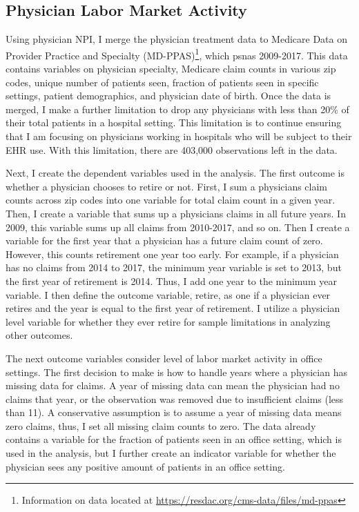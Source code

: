 \documentclass[12pt]{article}
\begin{document}
\subsection{Physician Labor Market Activity}\label{sec:appmdppas}

Using physician NPI, I merge the physician treatment data to Medicare Data on Provider Practice and Specialty (MD-PPAS)\footnote{Information on data located at \hyperlink{https://resdac.org/cms-data/files/md-ppas}{https://resdac.org/cms-data/files/md-ppas}}, which psnas 2009-2017. This data contains variables on physician specialty, Medicare claim counts in various zip codes, unique number of patients seen, fraction of patients seen in specific settings, patient demographics, and physician date of birth. Once the data is merged, I make a further limitation to drop any physicians with less than 20\% of their total patients in a hospital setting. This limitation is to continue ensuring that I am focusing on physicians working in hospitals who will be subject to their EHR use. With this limitation, there are 403,000 observations left in the data. 

Next, I create the dependent variables used in the analysis. The first outcome is whether a physician chooses to retire or not. First, I sum a physicians claim counts across zip codes into one variable for total claim count in a given year. Then, I create a variable that sums up a physicians claims in all future years. In 2009, this variable sums up all claims from 2010-2017, and so on. Then I create a variable for the first year that a physician has a future claim count of zero. However, this counts retirement one year too early. For example, if a physician has no claims from 2014 to 2017, the minimum year variable is set to 2013, but the first year of retirement is 2014. Thus, I add one year to the minimum year variable. I then define the outcome variable, retire, as one if a physician ever retires and the year is equal to the first year of retirement. I utilize a physician level variable for whether they ever retire for sample limitations in analyzing other outcomes. 

The next outcome variables consider level of labor market activity in office settings. The first decision to make is how to handle years where a physician has missing data for claims. A year of missing data can mean the physician had no claims that year, or the observation was removed due to insufficient claims (less than 11). A conservative assumption is to assume a year of missing data means zero claims, thus, I set all missing claim counts to zero. The data already contains a variable for the fraction of patients seen in an office setting, which is used in the analysis, but I further create an indicator variable for whether the physician sees any positive amount of patients in an office setting. 
\end{document}
